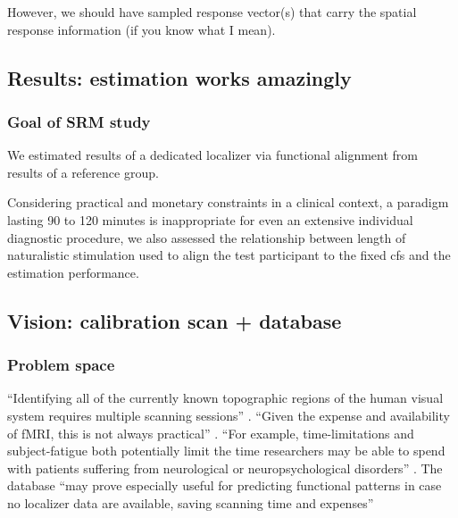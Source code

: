 %
However, we should have sampled response vector(s) that carry the spatial
response information (if you know what I mean).



\subsection{Results: estimation works amazingly}


\subsubsection{Goal of SRM study}
We estimated results of a dedicated localizer \citep{sengupta2016extension} via
functional alignment from results of a reference group.


Considering practical and monetary constraints in a clinical context, a paradigm
lasting 90 to 120 minutes is inappropriate for even an extensive individual
diagnostic procedure, we also assessed the relationship between length of
naturalistic stimulation used to align the test participant to the fixed
\ac{cfs} and the estimation performance.



\subsection{Vision: calibration scan + database}





\subsubsection{Problem space}

``Identifying all of the currently known topographic regions of the human visual
system requires multiple scanning sessions'' \citep{wang2015probabilistic}.
%
``Given the expense and availability of fMRI, this is not always practical''
\citep{wang2015probabilistic}.
%
``For example, time-limitations and subject-fatigue both potentially limit the
time researchers may be able to spend with patients suffering from neurological
or neuropsychological disorders'' \citep{wang2015probabilistic}.
%
The database ``may prove especially useful for predicting functional patterns in
case no localizer data are available, saving scanning time and expenses''
\citep{rosenke2021probabilistic}


